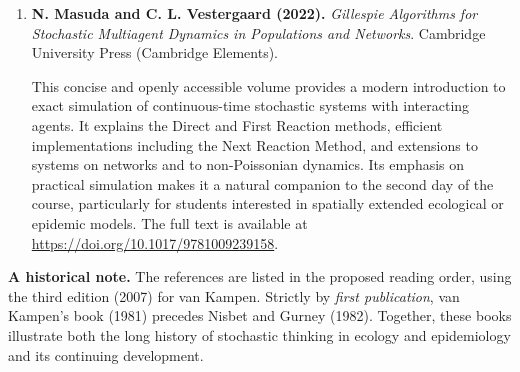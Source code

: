 \begin{enumerate}
\item \textbf{N. Masuda and C. L. Vestergaard (2022).} \emph{Gillespie Algorithms for Stochastic Multiagent Dynamics in Populations and Networks}. Cambridge University Press (Cambridge Elements). \citep{MasudaVestergaard2022Gillespie}

This concise and openly accessible volume provides a modern introduction to exact simulation of continuous-time stochastic systems with interacting agents. It explains the Direct and First Reaction methods, efficient implementations including the Next Reaction Method, and extensions to systems on networks and to non-Poissonian dynamics. Its emphasis on practical simulation makes it a natural companion to the second day of the course, particularly for students interested in spatially extended ecological or epidemic models. The full text is available at \url{https://doi.org/10.1017/9781009239158}.
\end{enumerate}

\noindent\textbf{A historical note.} The references are listed in the proposed reading order, using the third edition (2007) for van Kampen. Strictly by \emph{first publication}, van Kampen's book (1981) precedes Nisbet and Gurney (1982). Together, these books illustrate both the long history of stochastic thinking in ecology and epidemiology and its continuing development.
